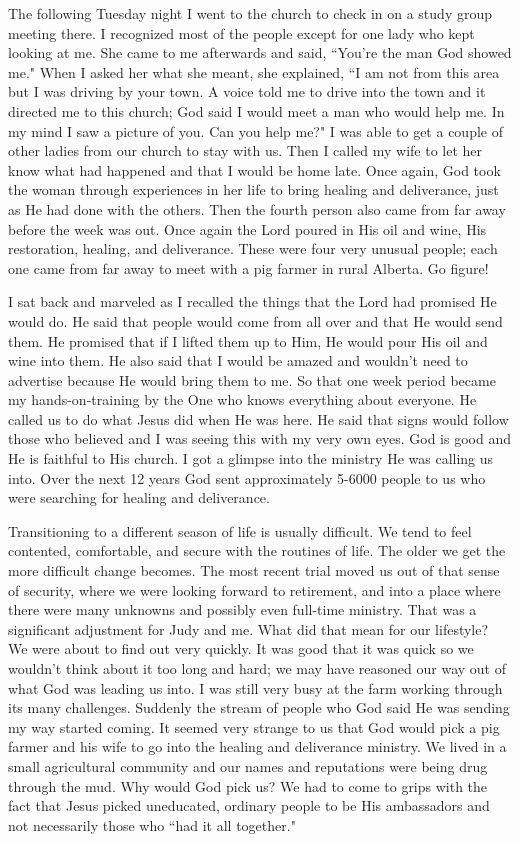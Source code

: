 \documentclass[oneside]{book}
\begin{document}
The following Tuesday night I went to the church to check in on a study group meeting there. I recognized most of the people except for one lady who kept looking at me. She came to me afterwards and said, ``You're the man God showed me." When I asked her what she meant, she explained, ``I am not from this area but I was driving by your town. A voice told me to drive into the town and it directed me to this church; God said I would meet a man who would help me. In my mind I saw a picture of you. Can you help me?"  I was able to get a couple of other ladies from our church to stay with us. Then I called my wife to let her know what had happened and that I would be home late. Once again, God took the woman through experiences in her life to bring healing and deliverance, just as He had done with the others. Then the fourth person also came from far away before the week was out. Once again the Lord poured in His oil and wine, His restoration, healing, and deliverance. These were four very unusual people; each one came from far away to meet with a pig farmer in rural Alberta. Go figure!

I sat back and marveled as I recalled the things that the Lord had promised He would do. He said that people would come from all over and that He would send them. He promised that if I lifted them up to Him, He would pour His oil and wine into them. He also said that I would be amazed and wouldn't need to advertise because He would bring them to me. So that one week period became my hands-on-training by the One who knows everything about everyone. He called us to do what Jesus did when He was here. He said that signs would follow those who believed and I was seeing this with my very own eyes. God is good and He is faithful to His church. I got a glimpse into the ministry He was calling us into. Over the next 12 years God sent approximately 5-6000 people to us who were searching for healing and deliverance. 

Transitioning to a different season of life is usually difficult. We tend to feel contented, comfortable, and secure with the routines of life. The older we get the more difficult change becomes. The most recent trial moved us out of that sense of security, where we were looking forward to retirement, and into a place where there were many unknowns and possibly even full-time ministry. That was a significant adjustment for Judy and me. What did that mean for our lifestyle? We were about to find out very quickly. It was good that it was quick so we wouldn't think about it too long and hard; we may have reasoned our way out of what God was leading us into. I was still very busy at the farm working through its many challenges. Suddenly the stream of people who God said He was sending my way started coming. It seemed very strange to us that God would pick a pig farmer and his wife to go into the healing and deliverance ministry. We lived in a small agricultural community and our names and reputations were being drug through the mud. Why would God pick us? We had to come to grips with the fact that Jesus picked uneducated, ordinary people to be His ambassadors and not necessarily those who ``had it all together." 
\end{document}
